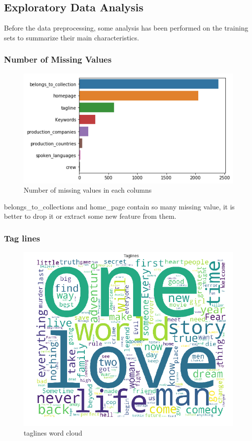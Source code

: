 \documentclass{article}
\begin{document}
\pagebreak

\subsection{Exploratory Data Analysis}
Before the data preprocessing, some analysis has been performed on the training sets to summarize their main characteristics.


\subsubsection{Number of Missing Values}
\begin{figure}[h]
  \centering
  \includegraphics[scale=0.7]{collections.png}
  \caption{Number of missing values in each columns}
\end{figure}

belongs\_to\_collections and home\_page contain so many missing value, it is better to drop it or extract some new feature from them.

\subsubsection{Tag lines}
\begin{figure}[h]
  \centering
  \includegraphics[scale=0.5]{taglines.png}
  \caption{taglines word cloud}
\end{figure}
\end{document}
